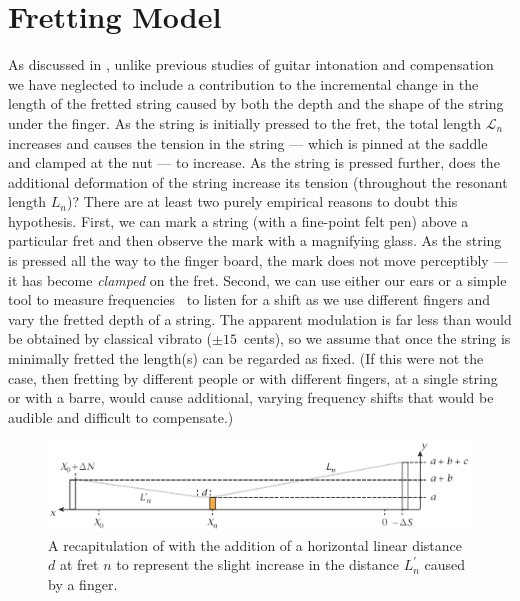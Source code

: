 %
%
%

 \section{Fretting Model\label{app:fret}}

As discussed in , unlike previous studies of guitar intonation and compensation~\cite{ref:byers1996cgi,ref:varieschi2010icf} we have neglected to include a contribution to the incremental change in the length of the fretted string caused by both the depth and the shape of the string under the finger. As the string is initially pressed to the fret, the total length $\mathcal{L}_n$ increases and causes the tension in the string --- which is pinned at the saddle and clamped at the nut --- to increase. As the string is pressed further, does the additional deformation of the string increase its tension (throughout the resonant length $L_n$)? There are at least two purely empirical reasons to doubt this hypothesis. First, we can mark a string (with a fine-point felt pen) above a particular fret and then observe the mark with a magnifying glass. As the string is pressed all the way to the finger board, the mark does not move perceptibly --- it has become \emph{clamped} on the fret. Second, we can use either our ears or a simple tool to measure frequencies~\cite{ref:pgtweb} to listen for a shift as we use different fingers and vary the fretted depth of a string. The apparent modulation is far less than would be obtained by classical vibrato ($\pm15$~cents), so we assume that once the string is minimally fretted the length(s) can be regarded as fixed. (If this were not the case, then fretting by different people or with different fingers, at a single string or with a barre, would cause additional, varying frequency shifts that would be audible and difficult to compensate.)

\begin{figure}
    \centering
    \includegraphics[width=6.0in]{../figures/fretting_schematic}
    \caption{\label{fig:fretting_schematic} A recapitulation of  with the addition of a horizontal linear distance $d$ at fret $n$ to represent the slight increase in the distance $L_n^\prime$ caused by a finger.}
   \end{figure}
  
